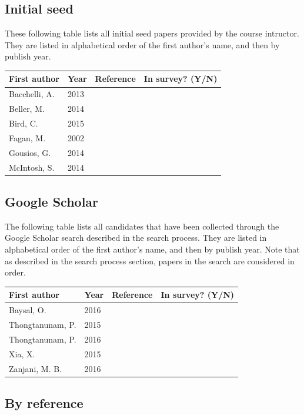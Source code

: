 \documentclass[]{book}
\begin{document}
\subsection{Initial seed}\label{initial-seed-1}

These following table lists all initial seed papers provided by the
course intructor. They are listed in alphabetical order of the first
author's name, and then by publish year.

\begin{longtable}[]{@{}llll@{}}
\toprule
First author & Year & Reference & In survey? (Y/N)\tabularnewline
\midrule
\endhead
Bacchelli, A. & 2013 & \citet{bacchelli2013expectations}
&\tabularnewline
Beller, M. & 2014 & \citet{beller2014modern} &\tabularnewline
Bird, C. & 2015 & \citet{bird2015lessons} &\tabularnewline
Fagan, M. & 2002 & \citet{fagan2002design} &\tabularnewline
Gousios, G. & 2014 & \citet{gousios2014exploratory} &\tabularnewline
McIntosh, S. & 2014 & \citet{mcintosh2014impact} &\tabularnewline
\bottomrule
\end{longtable}

\subsection{Google Scholar}\label{google-scholar}

The following table lists all candidates that have been collected
through the Google Scholar search described in the search process. They
are listed in alphabetical order of the first author's name, and then by
publish year. Note that as described in the search process section,
papers in the search are considered in order.

\begin{longtable}[]{@{}llll@{}}
\toprule
First author & Year & Reference & In survey? (Y/N)\tabularnewline
\midrule
\endhead
Baysal, O. & 2016 & \citet{baysal2016investigating} &\tabularnewline
Thongtanunam, P. & 2015 & \citet{thongtanunam2015should}
&\tabularnewline
Thongtanunam, P. & 2016 & \citet{thongtanunam2016revisiting}
&\tabularnewline
Xia, X. & 2015 & \citet{xia2015should} &\tabularnewline
Zanjani, M. B. & 2016 & \citet{zanjani2016automatically}
&\tabularnewline
\bottomrule
\end{longtable}

\subsection{By reference}\label{by-reference}
\end{document}
